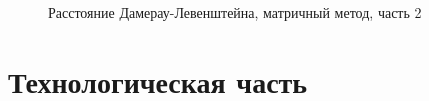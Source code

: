 \documentclass[12pt,a4paper]{report}
\begin{document}
\begin{figure}[h]
\caption{Расстояние Дамерау-Левенштейна, матричный метод, часть 2}
\label{fig:image}
\end{figure}

\newpage
\chapter{Технологическая часть}
\end{document}
